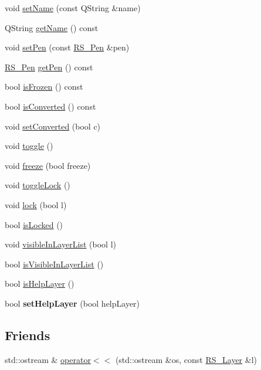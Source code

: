 \begin{DoxyCompactItemize}
\item 
void \hyperlink{classRS__Layer_af4e1b3caf8a7132d0cd298964863acee}{set\-Name} (const Q\-String \&name)
\item 
Q\-String \hyperlink{classRS__Layer_a1a8509534f4f51ab2fcbe137efe84e36}{get\-Name} () const 
\item 
void \hyperlink{classRS__Layer_ac5be377e1a80e3e19f12ba7b9dfc5fc8}{set\-Pen} (const \hyperlink{classRS__Pen}{R\-S\-\_\-\-Pen} \&pen)
\item 
\hyperlink{classRS__Pen}{R\-S\-\_\-\-Pen} \hyperlink{classRS__Layer_a7c3b69e215ec71b6f67996b13ba14194}{get\-Pen} () const 
\item 
bool \hyperlink{classRS__Layer_a4bac277cb1e988be074d2850ef9b7cce}{is\-Frozen} () const 
\item 
bool \hyperlink{classRS__Layer_a13d3a2fec12c4b3082f1ad5f0f33a2fc}{is\-Converted} () const 
\item 
void \hyperlink{classRS__Layer_a5ff9c824b2c6d22cff58d0e7fe7c22d6}{set\-Converted} (bool c)
\item 
void \hyperlink{classRS__Layer_a49082d20120732c79f781f9824cc4367}{toggle} ()
\item 
void \hyperlink{classRS__Layer_a9a8140a09260cd97508af31016ced14a}{freeze} (bool freeze)
\item 
void \hyperlink{classRS__Layer_a201e3d60c9c2098edca71316a1c4d463}{toggle\-Lock} ()
\item 
void \hyperlink{classRS__Layer_a10191b7f9abd3706bfc76fc961b3bfd9}{lock} (bool l)
\item 
bool \hyperlink{classRS__Layer_a9d78b6003d8ce252ef7cd6c309f14770}{is\-Locked} ()
\item 
void \hyperlink{classRS__Layer_aad843c09bc090f264e748044501c7a8d}{visible\-In\-Layer\-List} (bool l)
\item 
bool \hyperlink{classRS__Layer_a33f3643fa4c5c5cb8cdd3f233a7ffbf1}{is\-Visible\-In\-Layer\-List} ()
\item 
bool \hyperlink{classRS__Layer_aa78c3119d35be5fb815c8d365e11d33e}{is\-Help\-Layer} ()
\item 
\hypertarget{classRS__Layer_aa7112c7d3612310c3a788a3c831f644b}{bool {\bfseries set\-Help\-Layer} (bool help\-Layer)}\label{classRS__Layer_aa7112c7d3612310c3a788a3c831f644b}

\end{DoxyCompactItemize}
\subsection*{Friends}
\begin{DoxyCompactItemize}
\item 
std\-::ostream \& \hyperlink{classRS__Layer_ab373691fa4daa129d79f6765bfd34299}{operator$<$$<$} (std\-::ostream \&os, const \hyperlink{classRS__Layer}{R\-S\-\_\-\-Layer} \&l)
\end{DoxyCompactItemize}


